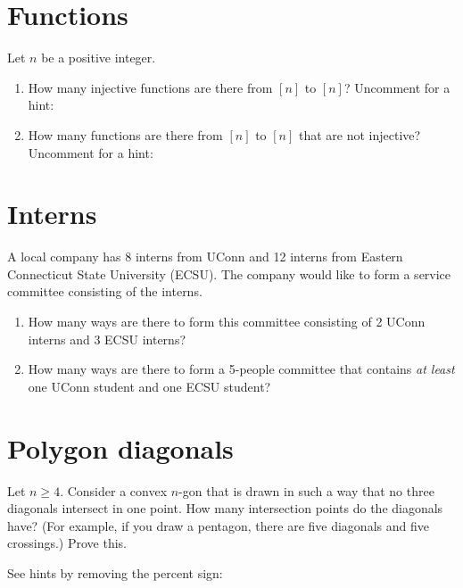 \documentclass[12pt]{amsart}
\begin{document}
\section{Functions}\label{sec:functions}
Let $n$ be a positive integer.
\begin{enumerate}
\item How many injective functions are there from $[n]$ to $[n]$? 
Uncomment for a hint:
\item How many functions are there from $[n]$ to $[n]$ that are not injective?
Uncomment for a hint:
\end{enumerate}


\section{Interns}
A local company has 8 interns from UConn and 12 interns from Eastern Connecticut State University (ECSU). The company would like to form a service committee consisting of the interns. 

\begin{enumerate}
\item How many ways are there to form this committee consisting of 2 UConn interns and 3 ECSU interns? 
\item How many ways are there to form a 5-people committee that contains \emph{at least} one UConn student and one ECSU student?
\end{enumerate}



\section{Polygon diagonals}
Let $n\geq 4$. Consider a convex $n$-gon that is drawn in such a way that no three diagonals intersect in one point. How many intersection points do the diagonals have? (For example, if you draw a pentagon, there are five diagonals and five crossings.) Prove this. 

\noindent See hints by removing the percent sign: 
\end{document}
